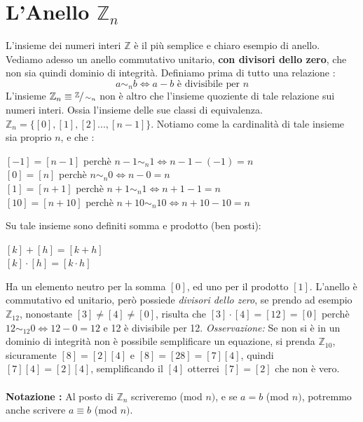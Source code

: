 \documentclass[12pt, letterpaper]{article}
\begin{document}
\section{L'Anello \(\mathbb{Z}_n\)}
L'insieme dei numeri interi \(\mathbb{Z}\) è il più semplice e chiaro esempio di anello. Vediamo adesso un anello 
commutativo unitario, \textbf{con divisori dello zero}, che non sia quindi dominio di integrità. Definiamo 
prima di tutto una relazione : \begin{equation}
    a\sim_n b \iff a-b \text{ è divisibile per }n
\end{equation}
L'insieme \(\mathbb{Z}_n\equiv \sfrac{\mathbb{Z}}{\sim_n}\) non è altro che l'insieme quoziente di tale relazione sui numeri interi.
Ossia l'insieme delle sue classi di equivalenza. \(\mathbb{Z}_n=\{[0],[1],[2]...,[n-1]\}\).
Notiamo come la cardinalità di tale insieme sia proprio \(n\), e che :\begin{center}
    \([-1]=[n-1]\) perchè \(n-1\sim_n 1 \iff n-1-(-1)=n\)\\
    \([0]=[n]\) perchè \(n\sim_n 0 \iff n-0=n\)\\
    \([1]=[n+1]\) perchè \(n+1\sim_n 1 \iff n+1-1=n\)\\
    \([10]=[n+10]\) perchè \(n+10\sim_n 10 \iff n+10-10=n\)\\
\end{center} 
Su tale insieme sono definiti somma e prodotto (ben posti):\begin{center}
    \([k]+[h]=[k+h]\)\\\([k]\cdot[h]=[k\cdot h]\)
\end{center}Ha un elemento neutro per la somma \([0]\), ed 
uno per il prodotto \([1]\). L'anello è commutativo ed unitario, però possiede \textit{divisori dello zero}, se prendo 
ad esempio \(\mathbb{Z}_{12}\), nonostante \([3]\ne[4]\ne[0]\), risulta che \([3]\cdot[4]=[12]=[0]\) perchè 
\(12\sim_{12}0\iff12-0=12\) e 12 è divisibile per 12. \textit{Osservazione:} Se non si è in un dominio di integrità 
non è possibile semplificare un equazione, si prenda \(\mathbb{Z}_{10}\), sicuramente \([8]=[2][4]\) e 
\([8]=[28]=[7][4]\), quindi \([7][4]=[2][4]\), semplificando il \([4]\) otterrei \([7]=[2]\) che non è vero.
\\\hphantom{.}\\\textbf{Notazione : } Al posto di \(\mathbb{Z}_n\) scriveremo (mod \(n)\), e se \(a=b\) (mod \(n)\), potremmo anche 
scrivere  \(a\equiv b\) (mod \(n)\).
\end{document}
